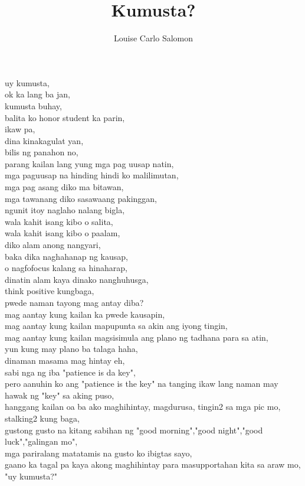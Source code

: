 \documentclass{article}
\title{Kumusta?}
\author{Louise Carlo Salomon}
\date{}
\begin{document}
    \maketitle
    \begin{center}
        uy kumusta,\\
ok ka lang ba jan,\\
kumusta buhay,\\
balita ko honor student ka parin,\\
ikaw pa,\\
dina kinakagulat yan,\\
bilis ng panahon no,\\
parang kailan lang yung mga pag uusap natin,\\
mga paguusap na hinding hindi ko malilimutan,\\
mga pag asang diko ma bitawan,\\
mga tawanang diko sasawaang pakinggan,\\
ngunit itoy naglaho nalang bigla,\\
wala kahit isang kibo o salita,\\
wala kahit isang kibo o paalam,\\
diko alam anong nangyari,\\
baka dika naghahanap ng kausap,\\
o nagfofocus kalang sa hinaharap,\\
dinatin alam kaya dinako nanghuhusga,\\
think positive kungbaga,\\
pwede naman tayong mag antay diba?\\
mag aantay kung kailan ka pwede kausapin,\\
mag aantay kung kailan mapupunta sa akin ang iyong tingin,\\
mag aantay kung kailan magsisimula ang plano ng tadhana para sa atin,\\
yun kung may plano ba talaga haha,\\
dinaman masama mag hintay eh,\\
sabi nga ng iba "patience is da key",\\
pero aanuhin ko ang "patience is the key" na tanging ikaw lang naman may hawak ng "key" sa aking puso, \\
hanggang kailan oa ba ako maghihintay, magdurusa, tingin2 sa mga pic mo, stalking2 kung baga, \\
gustong gusto na kitang sabihan ng "good morning","good night","good luck","galingan mo", \\
mga pariralang matatamis na gusto ko ibigtas sayo,\\
gaano ka tagal pa kaya akong maghihintay para masupportahan kita sa araw mo,\\
"uy kumusta?"
    \end{center}
\end{document}
